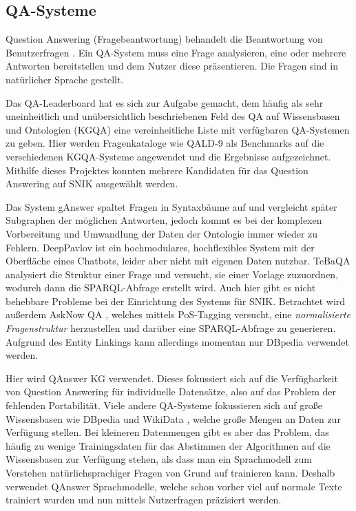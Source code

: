 \documentclass[utf8,biblatex]{lni}
\begin{document}
\subsection{QA-Systeme}

Question Answering (Fragebeantwortung) behandelt die Beantwortung von Benutzerfragen \citep{qadefinition}.
Ein QA-System muss eine Frage analysieren, eine oder mehrere Antworten bereitstellen und dem Nutzer diese präsentieren.
Die Fragen sind in natürlicher Sprache gestellt.

Das QA-Leaderboard \citep{leaderboardinproceedings} hat es sich zur Aufgabe gemacht,
dem häufig als sehr uneinheitlich und unübersichtlich \citep{diefenbachkbqa} beschriebenen Feld des QA auf Wissensbasen und Ontologien (KGQA) eine vereinheitliche Liste mit verfügbaren QA-Systemen zu geben.
Hier werden Fragenkataloge wie QALD-9 \cite{qald9} als Benchmarks auf die verschiedenen KGQA-Systeme angewendet und die Ergebnisse aufgezeichnet.
Mithilfe dieses Projektes konnten mehrere Kandidaten für das Question Answering auf SNIK ausgewählt werden.

Das System gAnswer \cite{ganswerapproach} spaltet Fragen in Syntaxbäume auf und vergleicht später Subgraphen der möglichen Antworten, jedoch kommt es bei der komplexen Vorbereitung und Umwandlung der Daten der Ontologie immer wieder zu Fehlern.
DeepPavlov \cite{deeppavlov} ist ein hochmodulares, hochflexibles System mit der Oberfläche eines Chatbots, leider aber nicht mit eigenen Daten nutzbar.
TeBaQA \cite{tebaqa} analysiert die Struktur einer Frage und versucht, sie einer Vorlage zuzuordnen, wodurch dann die SPARQL-Abfrage erstellt wird.
Auch hier gibt es nicht behebbare Probleme bei der Einrichtung des Systems für SNIK.
Betrachtet wird außerdem AskNow QA \cite{asknow}, welches mittels PoS-Tagging versucht, eine \emph{normalisierte Fragenstruktur} herzustellen und darüber eine SPARQL-Abfrage zu generieren.
Aufgrund des Entity Linkings kann allerdings momentan nur DBpedia verwendet werden.

Hier wird QAnswer KG \cite{qanswer} verwendet.
Dieses fokussiert sich auf die Verfügbarkeit von Question Answering für individuelle Datensätze,
also auf das Problem der fehlenden Portabilität.
Viele andere QA-Systeme fokussieren sich auf große Wissensbasen wie DBpedia und WikiData \cite{qald9plus},
welche große Mengen an Daten zur Verfügung stellen.
Bei kleineren Datenmengen gibt es aber das Problem, das häufig zu wenige Trainingsdaten für das Abstimmen der Algorithmen auf die Wissensbasen zur Verfügung stehen, als dass man ein Sprachmodell zum Verstehen natürlichsprachiger Fragen von Grund auf trainieren kann.
Deshalb verwendet QAnswer Sprachmodelle, welche schon vorher viel auf normale Texte trainiert wurden und nun mittels Nutzerfragen präzisiert werden.
\end{document}
